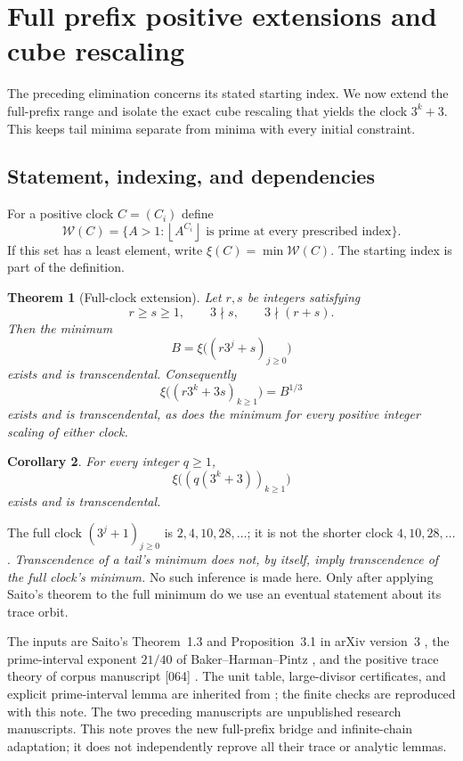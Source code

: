 \documentclass[11pt,a4paper]{article}
\newtheorem{theorem}{Theorem}[section]
\newtheorem{corollary}[theorem]{Corollary}\newtheorem{mainthm}[theorem]{Theorem}
\theoremstyle{definition}\newtheorem{definition}[theorem]{Definition}
\theoremstyle{remark}\newtheorem{remark}[theorem]{Remark}
\newcommand{\floor}[1]{\left\lfloor#1\right\rfloor}
\begin{document}
\endgroup

\section{Full prefix positive extensions and cube rescaling}\label{src:R07}
The preceding elimination concerns its stated starting index. We now extend the full-prefix range and isolate the exact cube rescaling that yields the clock $3^k+3$. This keeps tail minima separate from minima with every initial constraint.
\medskip
\begingroup




\subsection{Statement, indexing, and dependencies}

For a positive clock $C=(C_i)$ define
\[
 \mathcal W(C)=\{A>1:\floor{A^{C_i}}\text{ is prime at every prescribed index}\}.
\]
If this set has a least element, write $\xi(C)=\min\mathcal W(C)$.
The starting index is part of the definition.

\begin{theorem}[Full-clock extension]\label{R07:thm:full}
Let $r,s$ be integers satisfying
\[
                 r\ge s\ge1,\qquad 3\nmid s,\qquad 3\nmid(r+s).
\]
Then the minimum
\[
                  B=\xi\bigl((r3^j+s)_{j\ge0}\bigr)
\]
exists and is transcendental. Consequently
\[
                  \xi\bigl((r3^k+3s)_{k\ge1}\bigr)=B^{1/3}
\]
exists and is transcendental, as does the minimum for every positive
integer scaling of either clock.
\end{theorem}

\begin{corollary}\label{R07:cor:small}
For every integer $q\ge1$,
\[
                  \xi\bigl((q(3^k+3))_{k\ge1}\bigr)
\]
exists and is transcendental.
\end{corollary}

The full clock $(3^j+1)_{j\ge0}$ is $2,4,10,28,\ldots$;
it is not the shorter clock $4,10,28,\ldots$.
\emph{Transcendence of a tail's minimum does not, by itself, imply
transcendence of the full clock's minimum.} No such inference is made here.
Only after applying Saito's theorem to the full minimum do we use
an eventual statement about its trace orbit.

The inputs are Saito's Theorem~1.3 and Proposition~3.1 in
arXiv version~3 \cite{Saito}, the prime-interval exponent $21/40$
of Baker--Harman--Pintz \cite{BHP}, and the positive trace theory of
corpus manuscript [064] \cite{K064}. The unit table, large-divisor
certificates, and explicit prime-interval lemma are inherited from
\cite{P01}; the finite checks are reproduced with this note.
The two preceding manuscripts are unpublished research manuscripts.
This note proves the new full-prefix bridge and infinite-chain adaptation;
it does not independently reprove all their trace or analytic lemmas.
\end{document}
